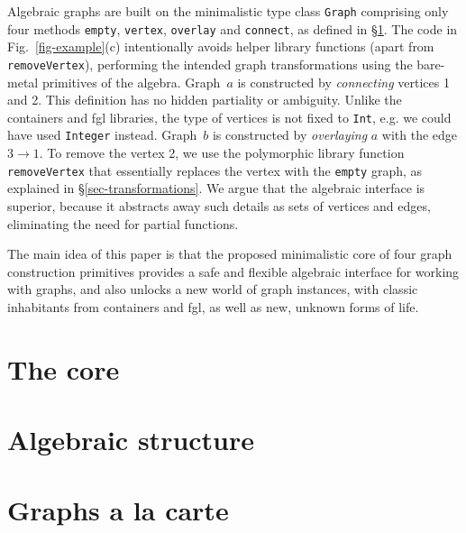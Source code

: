 \documentclass[acmlarge,anonymous]{acmart}\settopmatter{printfolios=true}
\newcommand{\hs}{\texttt}
\begin{document}
Algebraic graphs are built on the minimalistic type class \hs{Graph} comprising
only four methods \hs{empty}, \hs{vertex}, \hs{overlay} and \hs{connect}, as
defined in \S\ref{sec-core}. The code in
Fig.~\ref{fig-example}(c) intentionally avoids helper library functions (apart
from \hs{removeVertex}), performing the intended graph transformations using the
bare-metal primitives of the algebra. Graph~$a$ is constructed by \emph{connecting}
vertices 1 and 2. This definition has no hidden partiality or ambiguity.
Unlike the \textsf{containers} and \textsf{fgl} libraries, the type of vertices
is not fixed to \hs{Int}, e.g. we could have used \hs{Integer} instead.
Graph~$b$ is constructed by \emph{overlaying} $a$ with the edge $3 \rightarrow 1$.
To remove the vertex 2, we use the polymorphic library function
\hs{removeVertex} that essentially replaces the vertex with the \hs{empty} graph,
as explained in \S\ref{sec-transformations}. We argue that the algebraic
interface is superior, because it abstracts away such details as sets of
vertices and edges, eliminating the need for partial functions.

The main idea of this paper is that the proposed minimalistic core of four graph
construction primitives provides a safe and flexible algebraic interface
for working with graphs, and also unlocks a new world of graph instances, with
classic inhabitants from \textsf{containers} and \textsf{fgl}, as well
as new, unknown forms of life.




\section{The core}\label{sec-core}

\section{Algebraic structure}\label{sec-algebra}

\section{Graphs a la carte}\label{sec-a-la-carte}
\end{document}
